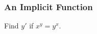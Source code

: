 \documentclass[14pt]{beamer}
\begin{document}

	\begin{frame}[t]
		\frametitle{An Implicit Function}

		\vspace{5mm}
		\begin{block}{}
			Find $y'$ if $x^{y}=y^{x}$.
		\end{block}
	\end{frame}





\end{document}
